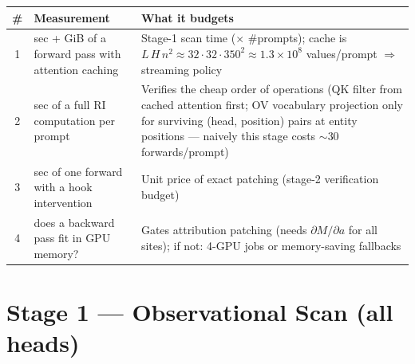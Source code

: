 \documentclass[11pt,a4paper]{article}
\begin{document}
\begin{center}\small
\begin{tabular}{clp{7.6cm}}
\toprule
\# & Measurement & What it budgets \\
\midrule
1 & sec + GiB of a forward pass with attention caching & Stage-1 scan time ($\times$ \#prompts); cache is $L\,H\,n^2 \approx 32\cdot 32\cdot 350^2 \approx 1.3\times10^8$ values/prompt $\Rightarrow$ streaming policy \\
2 & sec of a full RI computation per prompt & Verifies the cheap order of operations (QK filter from cached attention first; OV vocabulary projection only for surviving (head, position) pairs at entity positions --- naively this stage costs $\sim$30 forwards/prompt) \\
3 & sec of one forward with a hook intervention & Unit price of exact patching (stage-2 verification budget) \\
4 & does a backward pass fit in GPU memory? & Gates attribution patching (needs $\partial M/\partial a$ for all sites); if not: 4-GPU jobs or memory-saving fallbacks \\
\bottomrule
\end{tabular}
\end{center}

\section{Stage 1 --- Observational Scan (all heads)}
\end{document}
